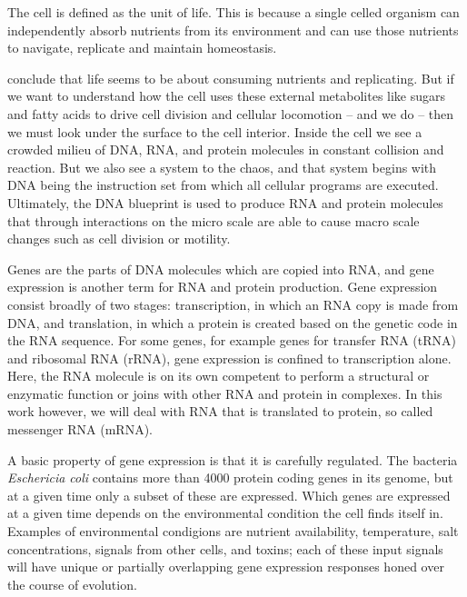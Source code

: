 %

The cell is defined as the unit of life. This is because a single celled
organism can independently absorb nutrients from its environment and can use
those nutrients to navigate, replicate and maintain homeostasis. 

conclude that life seems to be about consuming nutrients and replicating. But
if we want to understand how the cell uses these external metabolites like
sugars and fatty acids to drive cell division and cellular locomotion -- and we
do -- then we must look under the surface to the cell interior. Inside the cell
we see a crowded milieu of DNA, RNA, and protein molecules in constant
collision and reaction. But we also see a system to the chaos, and that system
begins with DNA being the instruction set from which all cellular programs are
executed. Ultimately, the DNA blueprint is used to produce RNA and protein
molecules that through interactions on the micro scale are able to cause macro
scale changes such as cell division or motility.

Genes are the parts of DNA molecules which are copied into RNA, and gene
expression is another term for RNA and protein production. Gene expression
consist broadly of two stages: transcription, in which an RNA copy is made from
DNA, and translation, in which a protein is created based on the genetic code
in the RNA sequence. For some genes, for example genes for transfer RNA (tRNA)
and ribosomal RNA (rRNA), gene expression is confined to transcription alone.
Here, the RNA molecule is on its own competent to perform a structural or
enzymatic function or joins with other RNA and protein in complexes. In this
work however, we will deal with RNA that is translated to protein, so called
messenger RNA (mRNA).

A basic property of gene expression is that it is carefully regulated. The
bacteria \textit{Eschericia coli} contains more than 4000 protein coding genes
in its genome, but at a given time only a subset of these are expressed. Which
genes are expressed at a given time depends on the environmental condition the
cell finds itself in. Examples of environmental condigions are nutrient
availability, temperature, salt concentrations, signals from other cells, and
toxins; each of these input signals will have unique or partially overlapping
gene expression responses honed over the course of evolution.

